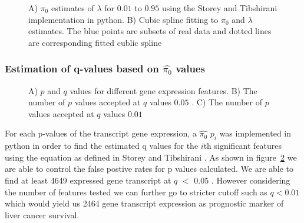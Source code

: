 \documentclass[9pt,twocolumn,twoside]{article}
\begin{document}
\begin{figure}[bh]
    \centering
    \caption{ A) $\pi_0$ estimates of $\lambda$  for $0.01$ to $0.95$ using the Storey and Tibshirani \cite{storey2003statistical} implementation in python. B) Cubic spline fitting to $\pi_0$  and $\lambda$ estimates. The blue points are subsets of real data and dotted lines are corresponding  fitted cublic spline   \tiny}
    \label{fig:estimate_pi}
\end{figure}

	\subsubsection {Estimation of q-values based on $\hat {\pi_0}$  values }


\begin{figure}
\hspace*{-4cm}         
\centering
{}
    \caption{A) $p$ and $q$ values for  different gene expression features. B) The number of $p$ values accepted at $q$ values $0.05$ . C) The number of $p$ values accepted at $q$ values $0.01$}
    \label{fig:pandq}
\end{figure}	
	
	 For each p-values of the transcript gene expression, a $\hat {\pi_0}$ $p_i$  was implemented in python in order to find the estimated q values for the  $i$th significant features using the equation as defined in Storey and Tibshirani \cite{storey2003statistical}. As shown in figure~\ref{fig:pandq} we are able to control the false postive rates for p values calculated. We are able to find at least 4649 expressed gene transcript at $q$ $<$ $0.05$ . However considering the number of features tested we can further go to stricter cutoff such as $q < 0.01$ which would yield us 2464 gene transcript expression  as prognostic marker of liver cancer survival. 
\end{document}

